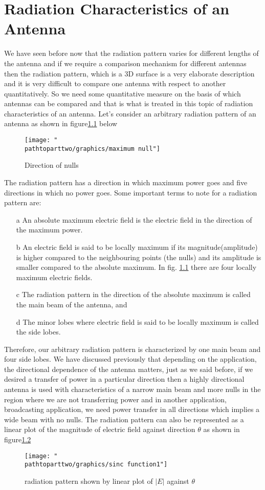 \chapter{Radiation Characteristics of an Antenna}
We have seen before now that the radiation pattern varies for different lengths of the antenna and if we require a comparison mechanism for different antennas then the radiation pattern, which is a 3D surface is a very elaborate description and it is very difficult to compare one antenna with respect to another quantitatively. So we need some quantitative measure on the basis of which antennas can be compared and that is what is treated in this topic of radiation characteristics of an antenna.
Let's consider an arbitrary radiation pattern of an antenna as shown in figure\ref{figure8} below

\begin{figure}[h]
\centering
\texttt{[image: "\\pathtoparttwo/graphics/maximum null"]}
\caption{Direction of nulls}
\label{figure8}
\end{figure}

The radiation pattern has a direction in which maximum power goes and five directions in which no power goes. Some important terms to note for a radiation pattern are:
\begin{enumerate}
\item [a]	An absolute maximum electric field is the electric field in the direction of the maximum power.
\item [b]	An electric field is said to be locally maximum if its magnitude(amplitude) is higher compared to the neighbouring points (the nulls) and its amplitude is smaller compared to the absolute maximum. In fig. \ref{figure8} there are four locally maximum electric fields.
\item [c]	The radiation pattern in the direction of the absolute maximum is called the main beam of the antenna, and
\item [d] 	The minor lobes where electric field is said to be locally maximum is called the side lobes.
\end{enumerate}

Therefore, our arbitrary radiation pattern is characterized by one main beam and four side lobes. We have discussed previously that depending on the application, the directional dependence of the antenna matters, just as we said before, if we desired a transfer of power in a particular direction then a highly directional antenna is used with characteristics of a narrow main beam and more nulls in the region where we are not transferring power and in another application, broadcasting application, we need power transfer in all directions which implies a wide beam with no nulls.
The radiation pattern can also be represented as a linear plot of the magnitude of electric field against direction $\theta$  as shown in figure\ref{figure9}
\begin{figure}[h]
\centering
\texttt{[image: "\\pathtoparttwo/graphics/sinc function1"]}
\caption{radiation pattern shown by linear plot of $|E|$ against $\theta$}
\label{figure9}
\end{figure}

